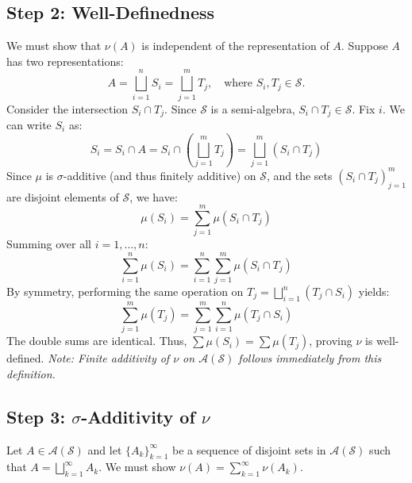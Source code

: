 \documentclass[12pt, a4paper]{article}
\theoremstyle{definition}
\newcommand{\Sem}{\mathcal{S}} %
\newcommand{\Alg}{\mathcal{A}(\mathcal{S})} %
\newcommand{\DisjointUnion}{\bigsqcup}
\begin{document}
\subsection{Step 2: Well-Definedness}
We must show that $\nu(A)$ is independent of the representation of $A$. Suppose $A$ has two representations:
\[
A = \DisjointUnion_{i=1}^n S_i = \DisjointUnion_{j=1}^m T_j, \quad \text{where } S_i, T_j \in \Sem.
\]
Consider the intersection $S_i \cap T_j$. Since $\Sem$ is a semi-algebra, $S_i \cap T_j \in \Sem$.
Fix $i$. We can write $S_i$ as:
\[
S_i = S_i \cap A = S_i \cap \left( \DisjointUnion_{j=1}^m T_j \right) = \DisjointUnion_{j=1}^m (S_i \cap T_j)
\]
Since $\mu$ is $\sigma$-additive (and thus finitely additive) on $\Sem$, and the sets $(S_i \cap T_j)_{j=1}^m$ are disjoint elements of $\Sem$, we have:
\[
\mu(S_i) = \sum_{j=1}^m \mu(S_i \cap T_j)
\]
Summing over all $i=1, \dots, n$:
\[
\sum_{i=1}^n \mu(S_i) = \sum_{i=1}^n \sum_{j=1}^m \mu(S_i \cap T_j)
\]
By symmetry, performing the same operation on $T_j = \DisjointUnion_{i=1}^n (T_j \cap S_i)$ yields:
\[
\sum_{j=1}^m \mu(T_j) = \sum_{j=1}^m \sum_{i=1}^n \mu(T_j \cap S_i)
\]
The double sums are identical. Thus, $\sum \mu(S_i) = \sum \mu(T_j)$, proving $\nu$ is well-defined.
\textit{Note: Finite additivity of $\nu$ on $\Alg$ follows immediately from this definition.}

\subsection{Step 3: $\sigma$-Additivity of $\nu$}
Let $A \in \Alg$ and let $\{A_k\}_{k=1}^\infty$ be a sequence of disjoint sets in $\Alg$ such that $A = \DisjointUnion_{k=1}^\infty A_k$. We must show $\nu(A) = \sum_{k=1}^\infty \nu(A_k)$.
\end{document}
